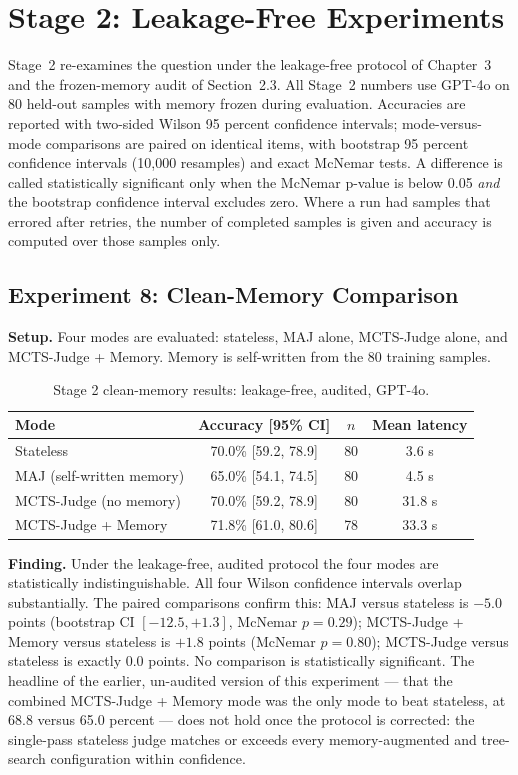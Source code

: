 \documentclass[12pt,a4paper]{report}
\begin{document}
\section{Stage 2: Leakage-Free Experiments}

Stage~2 re-examines the question under the leakage-free protocol of Chapter~3 and the frozen-memory audit of Section~2.3. All Stage~2 numbers use GPT-4o on 80 held-out samples with memory frozen during evaluation. Accuracies are reported with two-sided Wilson 95 percent confidence intervals; mode-versus-mode comparisons are paired on identical items, with bootstrap 95 percent confidence intervals (10{,}000 resamples) and exact McNemar tests. A difference is called statistically significant only when the McNemar p-value is below 0.05 \textit{and} the bootstrap confidence interval excludes zero. Where a run had samples that errored after retries, the number of completed samples is given and accuracy is computed over those samples only.

\subsection{Experiment 8: Clean-Memory Comparison}

\textbf{Setup.} Four modes are evaluated: stateless, MAJ alone, MCTS-Judge alone, and MCTS-Judge + Memory. Memory is self-written from the 80 training samples.

\begin{table}[h]
\centering
\begin{tabular}{lccc}
\toprule
Mode & Accuracy [95\% CI] & $n$ & Mean latency \\
\midrule
Stateless & 70.0\% [59.2, 78.9] & 80 & 3.6 s \\
MAJ (self-written memory) & 65.0\% [54.1, 74.5] & 80 & 4.5 s \\
MCTS-Judge (no memory) & 70.0\% [59.2, 78.9] & 80 & 31.8 s \\
MCTS-Judge + Memory & 71.8\% [61.0, 80.6] & 78 & 33.3 s \\
\bottomrule
\end{tabular}
\caption{Stage 2 clean-memory results: leakage-free, audited, GPT-4o.}
\label{tab:clean_memory}
\end{table}

\textbf{Finding.} Under the leakage-free, audited protocol the four modes are statistically indistinguishable. All four Wilson confidence intervals overlap substantially. The paired comparisons confirm this: MAJ versus stateless is $-5.0$ points (bootstrap CI $[-12.5, +1.3]$, McNemar $p = 0.29$); MCTS-Judge + Memory versus stateless is $+1.8$ points (McNemar $p = 0.80$); MCTS-Judge versus stateless is exactly $0.0$ points. No comparison is statistically significant. The headline of the earlier, un-audited version of this experiment --- that the combined MCTS-Judge + Memory mode was the only mode to beat stateless, at 68.8 versus 65.0 percent --- does not hold once the protocol is corrected: the single-pass stateless judge matches or exceeds every memory-augmented and tree-search configuration within confidence.
\end{document}
